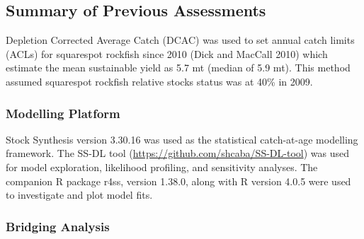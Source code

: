 \documentclass[11pt,
  english,
  a4paper,
]{article}
\begin{document}
\leavevmode\tagmcend\tagstructend


\hypertarget{summary-of-previous-assessments}{%
\subsection{Summary of Previous Assessments}\label{summary-of-previous-assessments}}

\leavevmode\tagmcend\tagstructend


Depletion Corrected Average Catch (DCAC) was used to set annual catch limits (ACLs) for squarespot rockfish since 2010 {(Dick and MacCall 2010)\leavevmode\tagmcend\tagstructend} which estimate the mean sustainable yield as 5.7 mt (median of 5.9 mt). This method assumed squarespot rockfish relative stocks status was at 40\% in 2009.

\leavevmode\tagmcend\tagstructend\par


\hypertarget{modelling-platform}{%
\subsubsection{Modelling Platform}\label{modelling-platform}}

\leavevmode\tagmcend\tagstructend


Stock Synthesis version 3.30.16 was used as the statistical catch-at-age modelling framework. The SS-DL tool ({\url{https://github.com/shcaba/SS-DL-tool}\leavevmode\tagmcend\tagstructend}) was used for model exploration, likelihood profiling, and sensitivity analyses. The companion R package r4ss, version 1.38.0, along with R version 4.0.5 were used to investigate and plot model fits.

\leavevmode\tagmcend\tagstructend\par


\hypertarget{bridging-analysis}{%
\subsubsection{Bridging Analysis}\label{bridging-analysis}}
\end{document}

